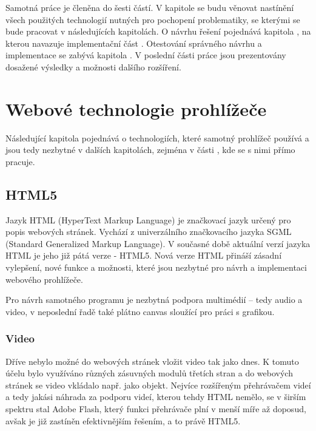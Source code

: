 Samotná práce je členěna do šesti částí. V kapitole  se budu věnovat nastínění všech použitých technologií nutných pro pochopení problematiky, se kterými se bude pracovat v následujících kapitolách. O návrhu řešení pojednává kapitola , na kterou navazuje implementační část . Otestování správného návrhu a implementace se zabývá kapitola  . V poslední části práce  jsou prezentovány dosažené výsledky a možnosti dalšího rozšíření.




\chapter{Webové technologie prohlížeče}
\label{chapter:2}
Následující kapitola pojednává o technologiích, které samotný prohlížeč používá a jsou tedy nezbytné v dalších kapitolách, zejména v části , kde se s nimi přímo pracuje.


\section{HTML5}

Jazyk HTML (HyperText Markup Language) je značkovací jazyk určený pro popis webových stránek. Vychází z univerzálního značkovacího jazyka SGML (Standard Generalized Markup Language). V současné době aktuální verzí  jazyka HTML je jeho již pátá verze -  HTML5. Nová verze HTML přináší zásadní vylepšení, nové funkce a možnosti, které jsou nezbytné pro návrh a implementaci webového prohlížeče. 

Pro návrh samotného programu je nezbytná podpora multimédií – tedy audio a video, v neposlední řadě také plátno canvas sloužící pro práci s grafikou.



\subsection{Video}
Dříve nebylo možné do webových stránek vložit video tak jako dnes. K tomuto účelu bylo využíváno různých zásuvných modulů třetích stran a do webových stránek se video vkládalo např. jako objekt. Nejvíce rozšířeným přehrávačem videí a tedy jakási náhrada za podporu videí, kterou tehdy HTML nemělo, se v širším spektru stal Adobe Flash, který funkci přehrávače plní v menší míře až doposud, avšak je již zastíněn efektivnějším řešením, a to právě HTML5.

